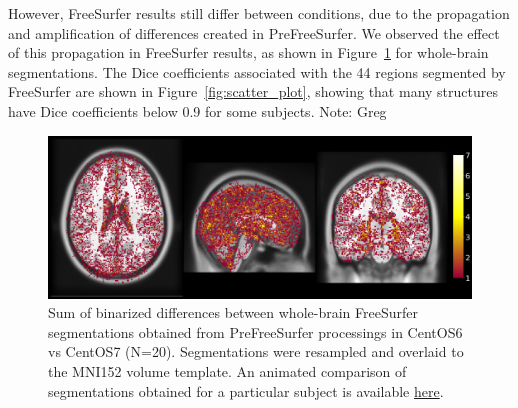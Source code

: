 \documentclass[a4paper,num-refs]{oup-contemporary}
\newcommand{\note}[2]{\color{blue}Note: #1\color{black}}
\begin{document}
However, FreeSurfer results still differ between conditions, due to the
propagation and amplification of differences created in PreFreeSurfer. We
observed the effect of this propagation in FreeSurfer results, as shown in
Figure~\ref{fig:tissue_class} for whole-brain segmentations. The
Dice coefficients associated with the 44 regions segmented by
FreeSurfer are shown in Figure~\ref{fig:scatter_plot}, showing that many 
structures have Dice coefficients below 0.9 for some subjects. \note{Greg}{awkward "many" followed by "some". reword?}
\begin{figure}
\centering
  \includegraphics[width=\columnwidth]{figures/brain_segmentation_mni.png} 
  \caption{Sum of binarized differences between whole-brain FreeSurfer
  segmentations obtained from PreFreeSurfer processings in CentOS6 vs CentOS7
   (N=20). Segmentations were resampled and overlaid to the MNI152 volume
  template. An animated comparison of segmentations obtained for a particular subject is available
\href{https://github.com/big-data-lab-team/HCP-reproducibility-paper/blob/master/figures/fs_brain_segmentation.gif}
{here}.
} 
  \label{fig:tissue_class}
\end{figure}
\end{document}
